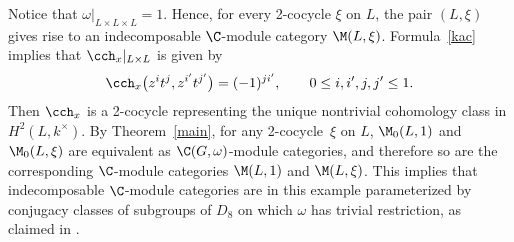 \begin{Example}
Notice that $\omega\vert_{L \times L\times L} = 1$. Hence, for every 2-cocycle $\xi$ on $L$, the pair $(L, \xi)$ gives rise to an indecomposable $\C$-module category $\M(L, \xi)$.
Formula~\eqref{kac} implies that $\cch_x\vert_{L \times L}$ is given by
\begin{gather*}\cch_x\big(z^{i}t^{j}, z^{i'}t^{j'}\big) = (-1)^{ji'}, \qquad 0\leq i, i', j, j' \leq 1.\end{gather*}
Then $\cch_x$ is a 2-cocycle representing the unique nontrivial cohomology class in $H^2(L, k^\times)$. By Theorem~\ref{main}, for any 2-cocycle~$\xi$ on $L$, $\M_0(L, 1)$ and $\M_0(L, \xi)$ are equivalent as $\C(G, \omega)$-module categories, and therefore so are the corresponding $\C$-module categories $\M(L, 1)$ and $\M(L, \xi)$. This implies that indecomposable $\C$-module categories are in this example parameterized by conjugacy classes of subgroups of $D_8$ on which $\omega$ has trivial restriction, as claimed in \cite[Section~6.4]{MN}.
\end{Example}
